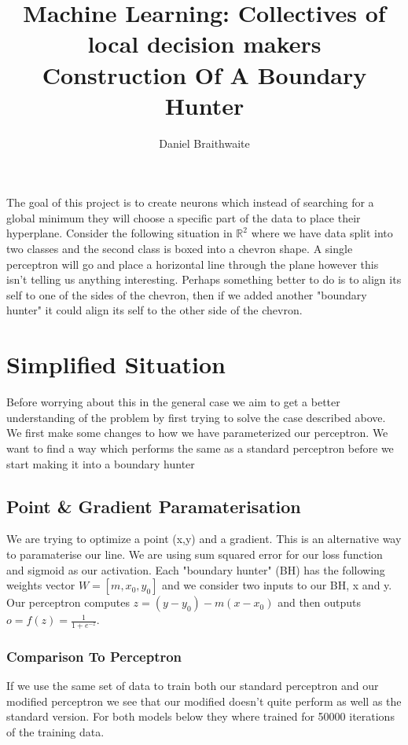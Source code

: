 \documentclass{article}
\title{%
	Machine Learning: Collectives of local decision makers\\
	\large Construction Of A Boundary Hunter
}
\author{Daniel Braithwaite}
\begin{document}
\maketitle

The goal of this project is to create neurons which instead of searching for a global minimum they will choose a specific part of the data to place their hyperplane. Consider the following situation in $\mathbb{R}^2$ where we have data split into two classes and the second class is boxed into a chevron shape. A single perceptron will go and place a horizontal line through the plane however this isn't telling us anything interesting. Perhaps something better to do is to align its self to one of the sides of the chevron, then if we added another "boundary hunter" it could align its self to the other side of the chevron.

\section{Simplified Situation}
Before worrying about this in the general case we aim to get a better understanding of the problem by first trying to solve the case described above. We first make some changes to how we have parameterized our perceptron. We want to find a way which performs the same as a standard perceptron before we start making it into a boundary hunter

\subsection{Point \& Gradient Paramaterisation}
We are trying to optimize a point (x,y) and a gradient. This is an alternative way to paramaterise our line. We are using sum squared error for our loss function and sigmoid as our activation. Each "boundary hunter" (BH) has the following weights vector $W = [m, x_0, y_0]$ and we consider two inputs to our BH, x and y. Our perceptron computes $z = (y - y_0) - m(x - x_0)$ and then outputs $o = f(z) = \frac{1}{1+e^{-z}}$.

\subsubsection{Comparison To Perceptron}
If we use the same set of data to train both our standard perceptron and our modified perceptron we see that our modified doesn't quite perform as well as the standard version. For both models below they where trained for 50000 iterations of the training data.
\end{document}
